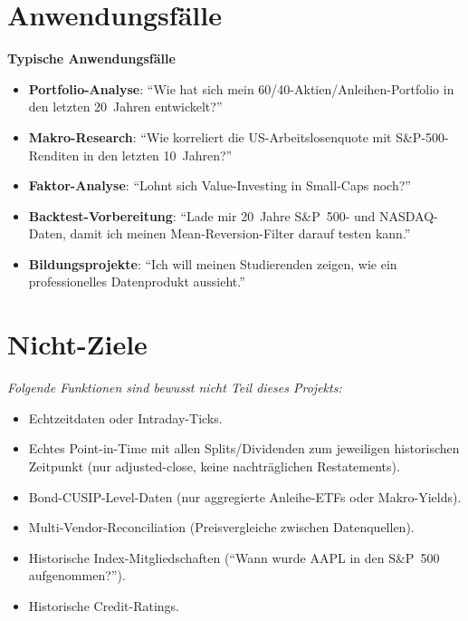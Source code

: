 \section{Anwendungsfälle}

\begin{beispiel}
\textbf{Typische Anwendungsfälle}
  \begin{itemize}
    \item \textbf{Portfolio-Analyse}: ``Wie hat sich mein
          60/40-Aktien/Anleihen-Portfolio in den letzten 20~Jahren
          entwickelt?''
    \item \textbf{Makro-Research}: ``Wie korreliert die
          US-Arbeitslosenquote mit S\&P-500-Renditen in den
          letzten 10~Jahren?''
    \item \textbf{Faktor-Analyse}: ``Lohnt sich Value-Investing
          in Small-Caps noch?''
    \item \textbf{Backtest-Vorbereitung}: ``Lade mir 20~Jahre
          S\&P~500- und NASDAQ-Daten, damit ich meinen
          Mean-Reversion-Filter darauf testen kann.''
    \item \textbf{Bildungsprojekte}: ``Ich will meinen Studierenden
          zeigen, wie ein professionelles Datenprodukt
          aussieht.''
  \end{itemize}
\end{beispiel}

\section{Nicht-Ziele}

\begin{warnung}
\rmfamily\itshape
Folgende Funktionen sind \emph{bewusst nicht} Teil dieses Projekts:

\begin{itemize}
  \item Echtzeitdaten oder Intraday-Ticks.
  \item Echtes Point-in-Time mit allen Splits/Dividenden zum
        jeweiligen historischen Zeitpunkt (nur adjusted-close,
        keine nachträglichen Restatements).
  \item Bond-CUSIP-Level-Daten (nur aggregierte Anleihe-ETFs
        oder Makro-Yields).
  \item Multi-Vendor-Reconciliation (Preisvergleiche zwischen
        Datenquellen).
  \item Historische Index-Mitgliedschaften (``Wann wurde AAPL
        in den S\&P~500 aufgenommen?'').
  \item Historische Credit-Ratings.
\end{itemize}
\end{warnung}

